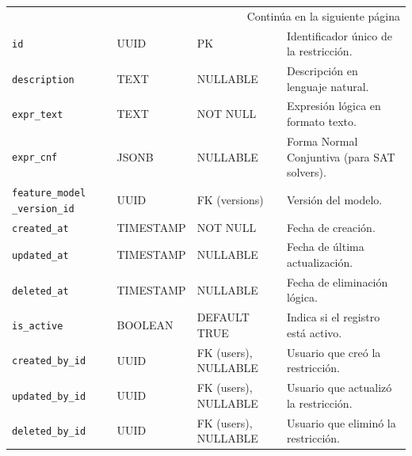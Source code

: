 {{{\begin{longtable}{|p{}|p{}|p{}|p{}|}
                \hline
                \multicolumn{4}{|r|}{{Continúa en la siguiente página}} \\
                \endfoot
                
                \hline
                \endlastfoot
                
                \texttt{id} & UUID & PK & Identificador único de la restricción. \\
                \hline
                \rowcolor[HTML]{EDEBF1}
                \texttt{description} & TEXT & NULLABLE & Descripción en lenguaje natural. \\
                \hline
                \texttt{expr\_text} & TEXT & NOT NULL & Expresión lógica en formato texto. \\
                \hline
                \rowcolor[HTML]{EDEBF1}
                \texttt{expr\_cnf} & JSONB & NULLABLE & Forma Normal Conjuntiva (para \ac{SAT} solvers). \\
                \hline
                \texttt{feature\_model 
                \_version\_id} & UUID & FK (versions) & Versión del modelo. \\
                \hline
                \rowcolor[HTML]{EDEBF1}
                \texttt{created\_at} & TIMESTAMP & NOT NULL & Fecha de creación. \\
                \hline
                \texttt{updated\_at} & TIMESTAMP & NULLABLE & Fecha de última actualización. \\
                \hline
                \rowcolor[HTML]{EDEBF1}
                \texttt{deleted\_at} & TIMESTAMP & NULLABLE & Fecha de eliminación lógica. \\
                \hline
                \texttt{is\_active} & BOOLEAN & DEFAULT TRUE & Indica si el registro está activo. \\
                \hline
                \rowcolor[HTML]{EDEBF1}
                \texttt{created\_by\_id} & UUID & FK (users), NULLABLE & Usuario que creó la restricción. \\
                \hline
                \texttt{updated\_by\_id} & UUID & FK (users), NULLABLE & Usuario que actualizó la restricción. \\
                \hline
                \rowcolor[HTML]{EDEBF1}
                \texttt{deleted\_by\_id} & UUID & FK (users), NULLABLE & Usuario que eliminó la restricción. \\
                \hline
            \end{longtable}

}}}
